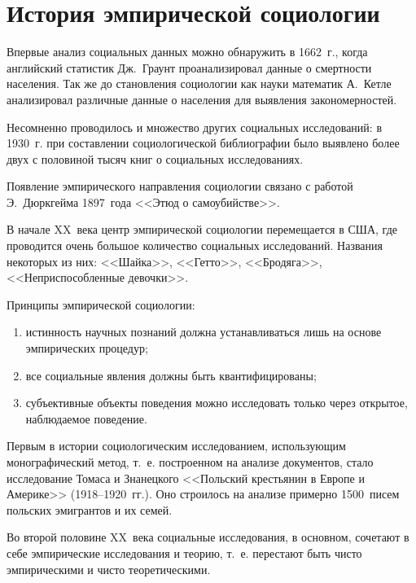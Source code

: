   \section{История эмпирической социологии}

    Впервые анализ социальных данных можно обнаружить в 1662~г., когда
    английский статистик Дж.~Граунт проанализировал данные о смертности
    населения. Так же до становления социологии как науки математик А.~Кетле
    анализировал различные данные о населения для выявления закономерностей.

    Несомненно проводилось и множество других социальных исследований: в 1930~г.
    при составлении социологической библиографии было выявлено более двух с
    половиной тысяч книг о социальных исследованиях.

    \charskip{*}

    Появление эмпирического направления социологии связано с работой
    Э.~Дюркгейма 1897~года <<Этюд о самоубийстве>>.

    В начале XX~века центр эмпирической социологии перемещается в США, где
    проводится очень большое количество социальных исследований. Названия
    некоторых из них: <<Шайка>>, <<Гетто>>, <<Бродяга>>, <<Неприспособленные
    девочки>>.

    \charskip{*}

    Принципы эмпирической социологии:
    \begin{enumerate}
      \item истинность научных познаний должна устанавливаться лишь на основе
        эмпирических процедур;
      \item все социальные явления должны быть квантифицированы;
      \item субъективные объекты поведения можно исследовать только через
        открытое, наблюдаемое поведение.
    \end{enumerate}

    \charskip{*}

    Первым в истории социологическим исследованием, использующим монографический
    метод, т.~е. построенном на анализе документов, стало исследование Томаса и
    Знанецкого <<Польский крестьянин в Европе и Америке>> (1918--1920~гг.). Оно
    строилось на анализе примерно 1500~писем польских эмигрантов и их семей.

    Во второй половине XX~века социальные исследования, в основном, сочетают в
    себе эмпирические исследования и теорию, т.~е. перестают быть чисто
    эмпирическими и чисто теоретическими.


